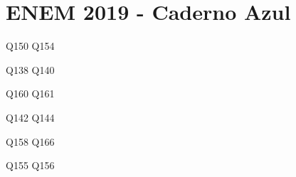 \chapter{ENEM 2019 - Caderno Azul}

\setlength{\columnseprule}{0.5pt}
\setlength{\columnsep}{30pt}
\def\columnseprulecolor{\color{mygray}}
%
\begin{multicols}{2}
{Q150}
{Q154}

{Q138}
{Q140}

{Q160}
{Q161}

{Q142}
{Q144}

{Q158}
{Q166}

{Q155}
{Q156}

    
\end{multicols}



